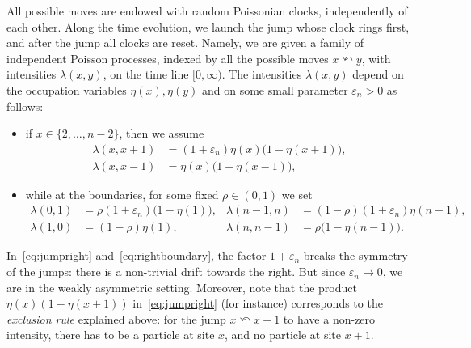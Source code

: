 \documentclass[10pt]{amsart}
\theoremstyle{definition}\newtheorem{defi}[theo]{Definition}\newtheorem{rema}[theo]{Remark}\newtheorem{exam}[theo]{Example}\newtheorem{exem}[theo]{Example}\newtheorem{nota}[theo]{Notation}
\begin{document}
All possible moves are endowed with random Poissonian clocks, independently of each other. Along the time evolution, we launch the jump whose clock rings first, and after the jump all clocks are reset. Namely, we are given a family of independent Poisson processes, indexed by all the possible moves $x
\curvearrowleft y $, with intensities $\lambda(x,y)$, on the time line $[0,\infty)$. The intensities $\lambda(x,y)$ depend on the occupation variables $\eta(x),\eta(y)$ and on some small parameter $\varepsilon_n >0$ as follows:
\begin{itemize}
\item if $x \in \{2,\dots,n-2\}$, then we assume
\begin{align}
\lambda(x,x+1) & = (1+\varepsilon_n)\eta(x)\big(1-\eta(x+1)\big), \label{eq:jumpright}
\\
\lambda(x,x-1) & = \eta(x)\big(1-\eta(x-1)\big), \label{eq:jumpleft}
\end{align}
\item while at the boundaries, for some fixed $\rho \in(0,1)$ we set
\begin{align}
\lambda(0,1) & = \rho(1+\varepsilon_n) \big(1-\eta(1)\big), &\lambda(n-1,n)& = (1-\rho)(1+\varepsilon_n)\eta(n-1), \label{eq:rightboundary}
\\
\lambda(1,0)& = (1-\rho)\eta(1), &\lambda(n,n-1) &= \rho\big(1-\eta(n-1)\big).\label{eq:leftboundary}
\end{align}
\end{itemize}
In~\eqref{eq:jumpright} and~\eqref{eq:rightboundary}, the factor $1+\varepsilon_n$ breaks the symmetry of the jumps: there is a non-trivial drift towards the right. But since $\varepsilon_n \to 0$, we are in the weakly asymmetric setting. Moreover, note that the product $\eta(x)(1-\eta(x+1))$ in~\eqref{eq:jumpright} (for instance) corresponds to the \emph{exclusion rule} explained above: for the jump $x\curvearrowleft x+1$ to have a non-zero intensity, there has to be a particle at site $x$, and no particle at site $x+1$.
\end{document}
